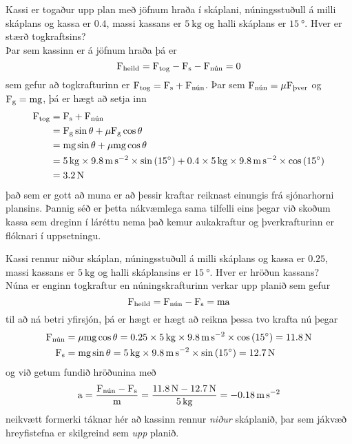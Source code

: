 \begin{formalexample}
Kassi er togaður upp plan með jöfnum hraða í skáplani, núningsstuðull á milli
skáplans og kassa er $\num{0.4}$, massi kassans er $\SI{5}{\kg}$ og halli skáplans
er $\SI{15}{\degree}$. Hver er stærð togkraftsins?
\\[4 ex]
Þar sem kassinn er á jöfnum hraða þá er
\[
	\textrm{F}_\text{heild} = \textrm{F}_\text{tog} - \textrm{F}_\text{s} -\textrm{F}_\text{nún} = 0
\]
sem gefur að togkrafturinn er $\textrm{F}_\text{tog} = \textrm{F}_\text{s} + \textrm{F}_\text{nún}$. Þar
sem $\textrm{F}_\text{nún} = \mu \textrm{F}_\text{þver}$ og $\textrm{F}_\text{g} = \textrm{m} \textrm{g}$,
þá er hægt að setja inn
\begin{align*}
	\uforce_\text{tog} &= \uforce_\text{s} + \uforce_\text{nún} \\
		&= \uforce_\text{g} \sin \theta + \mu \uforce_\text{g} \cos \theta \\
		&= \umass \uacceleg \sin \theta + \mu \umass \uacceleg \cos \theta \\
		&= \SI{5}{\kg} \times \SI{9.8}{\m\per\s\squared} 
			\times \sin \left( \SI{15}{\degree} \right)
			+ \num{0,4} \times \SI{5}{\kg} \times \SI{9.8}{\m\per\s\squared} 
			\times \cos \left( \SI{15}{\degree} \right) 
			\\
		&= \SI{3.2}{\N}
\end{align*}
það sem er gott að muna er að þessir kraftar reiknast einungis frá sjónarhorni
plansins. Þannig séð er þetta nákvæmlega sama tilfelli eins þegar við skoðum
kassa sem dreginn í láréttu nema það kemur aukakraftur og þverkrafturinn er
flóknari í uppsetningu.
\end{formalexample}

\begin{formalexample}
Kassi rennur niður skáplan, núningsstuðull á milli
skáplans og kassa er $\num{0.25}$, massi kassans er $\SI{5}{\kg}$ og halli skáplansins
er $\SI{15}{\degree}$. Hver er hröðun kassans?
\\[4 ex]
Núna er enginn togkraftur en núningskrafturinn verkar upp planið sem gefur
\[
	\textrm{F}_\text{heild} = \textrm{F}_\text{nún} - \textrm{F}_\text{s} = \textrm{m} \textrm{a}
\]
til að ná betri yfirsjón, þá er hægt er hægt að reikna þessa tvo krafta nú þegar
\begin{align*}
	\uforce_\text{nún} &= \mu \umass \uacceleg \cos \theta 
		= \num{0.25} \times \SI{5}{\kg} \times \SI{9.8}{\m\per\s\squared} 
			\times \cos \left( \SI{15}{\degree} \right) 
		= \SI{11.8}{\N} \\
	\uforce_\text{s} &= \umass \uacceleg \sin \theta
		= \SI{5}{\kg} \times \SI{9.8}{\m\per\s\squared} 
			\times \sin \left( \SI{15}{\degree} \right) 
		= \SI{12.7}{\N}
\end{align*}
og við getum fundið hröðunina með
\[
	\uaccelea = \frac{\uforce_\text{nún} - \uforce_\text{s}}{\umass}
		= \frac{ \SI{11.8}{\N} - \SI{12.7}{\N}  }{ \SI{5}{\kg} }
		= - \SI{0.18}{\m\per\s\squared}
\]
neikvætt formerki táknar hér að kassinn rennur \emph{niður} skáplanið, þar sem
jákvæð hreyfistefna er skilgreind sem \emph{upp} planið.
\end{formalexample}
